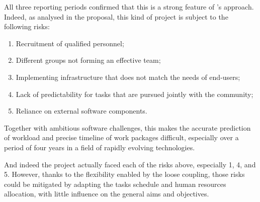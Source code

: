 All three reporting periods confirmed that this is a strong
feature of \ODK's approach. Indeed, as analysed in the proposal, this
kind of project is subject to the following risks:
\begin{enumerate}
\item Recruitment of qualified personnel;
\item Different groups not forming an effective team;
\item Implementing infrastructure that does not match the needs of end-users;
\item Lack of predictability for tasks that are pursued jointly with
  the community;
\item Reliance on external software components.
\end{enumerate}
Together with ambitious software challenges, this makes the accurate
prediction of workload and precise timeline of work packages
difficult, especially over a period of four years in a field of
rapidly evolving technologies.

And indeed the project actually faced each of the risks above,
especially 1, 4, and 5. However, thanks to the flexibility enabled by
the loose coupling, those risks could be mitigated by adapting the
tasks schedule and human resources allocation, with little influence
on the general aims and objectives.




